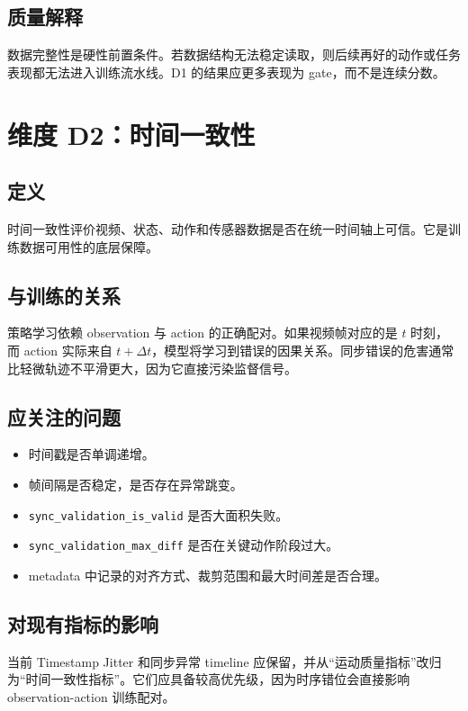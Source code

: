 \documentclass[UTF8,zihao=-4,oneside,openany]{ctexrep}
\begin{document}
\subsection{质量解释}

数据完整性是硬性前置条件。若数据结构无法稳定读取，则后续再好的动作或任务表现都无法进入训练流水线。D1 的结果应更多表现为 gate，而不是连续分数。

\section{维度 D2：时间一致性}

\subsection{定义}

时间一致性评价视频、状态、动作和传感器数据是否在统一时间轴上可信。它是训练数据可用性的底层保障。

\subsection{与训练的关系}

策略学习依赖 observation 与 action 的正确配对。如果视频帧对应的是 $t$ 时刻，而 action 实际来自 $t+\Delta t$，模型将学习到错误的因果关系。同步错误的危害通常比轻微轨迹不平滑更大，因为它直接污染监督信号。

\subsection{应关注的问题}

\begin{itemize}
  \item 时间戳是否单调递增。
  \item 帧间隔是否稳定，是否存在异常跳变。
  \item \texttt{sync\_validation\_is\_valid} 是否大面积失败。
  \item \texttt{sync\_validation\_max\_diff} 是否在关键动作阶段过大。
  \item metadata 中记录的对齐方式、裁剪范围和最大时间差是否合理。
\end{itemize}

\subsection{对现有指标的影响}

当前 Timestamp Jitter 和同步异常 timeline 应保留，并从“运动质量指标”改归为“时间一致性指标”。它们应具备较高优先级，因为时序错位会直接影响 observation-action 训练配对。
\end{document}
